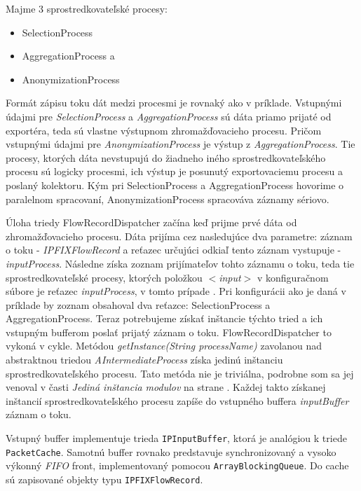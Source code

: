 Majme 3 sprostredkovateľské procesy: 
\begin{itemize}
\item SelectionProcess
\item AggregationProcess a 
\item AnonymizationProcess 
\end{itemize}

Formát zápisu toku dát medzi procesmi je rovnaký ako v príklade. Vstupnými údajmi pre 
\emph{SelectionProcess} a \emph{AggregationProcess} sú dáta priamo prijaté od exportéra, teda sú 
vlastne výstupnom  
zhromažďovacieho procesu. Pričom vstupnými údajmi pre \emph{AnonymizationProcess} je výstup 
z \emph{AggregationProcess}. Tie procesy, ktorých dáta nevstupujú do žiadneho iného sprostredkovateľského 
procesu sú logicky  procesmi, ich výstup je posunutý exportovaciemu procesu a poslaný 
kolektoru. Kým pri SelectionProcess a AggregationProcess hovorime o paralelnom spracovaní, 
AnonymizationProcess spracováva záznamy sériovo.

Úloha triedy FlowRecordDispatcher začína keď prijme prvé dáta od zhromažďovacieho procesu. Dáta prijíma 
cez nasledujúce dva 
parametre: záznam o toku - \emph{IPFIXFlowRecord} a reťazec určujúci odkiaľ tento záznam vystupuje - 
\emph{inputProcess}.
Následne získa zoznam prijímateľov tohto záznamu o toku, teda tie sprostredkovateľské procesy, 
ktorých položkou \emph{$<$input$>$} v konfiguračnom súbore je reťazec \emph{inputProcess}, v tomto 
prípade . Pri konfigurácii ako je daná v príklade by zoznam obsahoval dva reťazce: SelectionProcess
a AggregationProcess. Teraz potrebujeme získať inštancie týchto tried a ich vstupným bufferom poslať 
prijatý záznam o toku. FlowRecordDispatcher to vykoná v cykle. 
Metódou \emph{getInstance(String processName)} zavolanou nad
abstraktnou triedou \emph{AIntermediateProcess} získa jedinú inštanciu sprostredkovateľského procesu. 
Tato metóda nie je triviálna, podrobne som sa jej venoval v časti 
\emph{Jediná inštancia modulov} na strane \pageref{sec:singleton}. Každej takto získanej 
inštancií sprostredkovateľského procesu zapíše do vstupného buffera \emph{inputBuffer} záznam o toku.

Vstupný  buffer implementuje trieda \verb|IPInputBuffer|, ktorá je analógiou k triede \verb|PacketCache|.
Samotnú buffer rovnako predstavuje synchronizovaný a vysoko výkonný \emph{FIFO} front, implementovaný 
pomocou \verb|ArrayBlockingQueue|. Do cache sú zapisované objekty typu \verb|IPFIXFlowRecord|.

